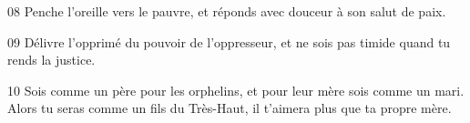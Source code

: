 
08 Penche l’oreille vers le pauvre, et réponds avec douceur à son salut de paix.

09 Délivre l’opprimé du pouvoir de l’oppresseur, et ne sois pas timide quand tu rends la justice.

10 Sois comme un père pour les orphelins, et pour leur mère sois comme un mari. Alors tu seras comme un fils du Très-Haut, il t’aimera plus que ta propre mère.